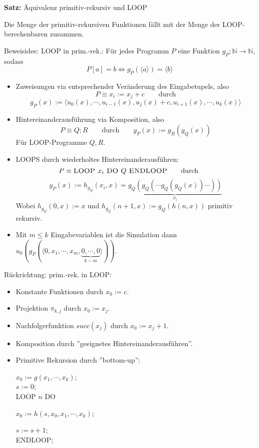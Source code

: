 \documentclass[a4paper,graphics,11pt]{article}
\begin{document}
\strut

\textbf{Satz:} Äquivalenz primitiv-rekursiv und LOOP

Die Menge der primitiv-rekursiven Funktionen fällt mit der Menge der LOOP-berechenbaren zusammen.

Beweisidee: LOOP in prim.-rek.: Für jedes Programm $P$ eine Funktion $g_P : \mathbb{N} \to \mathbb{N}$, sodass
$$
    P[a] = b \iff g_P(\langle a \rangle) = \langle b \rangle
$$
\begin{itemize}
    \item Zuweisungen via entsprechender Veränderung des Eingabetupels, also
        $$
            P \equiv x_i := x_j + c \qquad\text{durch}
        $$$$
            g_P(x) := \langle u_0(x),\cdots, u_{i-1}(x), u_j(x)+c, u_{i+1}(x),\cdots,u_k(x)\rangle
        $$
    \item Hintereinanderausführung via Komposition, also
        $$
            P \equiv Q;R \qquad\text{durch}\qquad g_P(x) := g_R(g_Q(x))
        $$
        Für LOOP-Programme $Q,R$.
    \item LOOPS durch wiederholtes Hintereinanderausführen:
        $$
            P \equiv \textsc{LOOP } x_i \textsc{ DO } Q \textsc{ ENDLOOP}
            \qquad\text{durch}\qquad
        $$$$
            g_P(x) := h_{g_Q}(x_i,x) = \underbrace{g_Q(g_Q(\cdots g_Q(g_Q(x))\cdots))}_{x_i}
        $$
        Wobei $h_{g_Q}(0,x) := x$ und $h_{g_Q}(n+1,x) := g_Q(h(n,x))$ primitiv rekursiv.
    \item Mit $m \leq k$ Eingabevariablen ist die Simulation dann
        $u_0(g_P(\langle 0, x_1,\cdots,x_m,\underbrace{0,\cdots,0}_{k-m}\rangle))$.
\end{itemize}

\newpage

Rückrichtung: prim.-rek. in LOOP:
\begin{itemize}
    \item Konstante Funktionen durch $x_0 := c$.
    \item Projektion $\pi_{k,j}$ durch $x_0 := x_j$.
    \item Nachfolgerfunktion $succ(x_j)$ durch $x_0 := x_j + 1$.
    \item Komposition durch ''geeignetes Hintereinanderausführen''.
    \item Primitive Rekursion durch ''bottom-up'':

        $x_0 := g(x_1,\cdots,x_k)$;\\
        $s := 0$;\\
        \textsc{LOOP} $n$ \textsc{DO}\\
        \strut\qquad$x_0 := h(s,x_0,x_1,\cdots,x_k)$;\\
        \strut\qquad$s := s+1$;\\
        \textsc{ENDLOOP};
\end{itemize}
\end{document}
